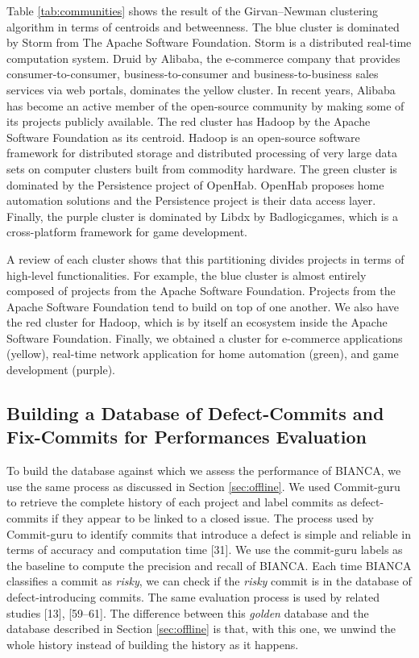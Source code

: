 \documentclass[conference]{IEEEtran}
\begin{document}
Table \ref{tab:communities} shows the result of the Girvan--Newman
clustering algorithm in terms of centroids and betweenness. The blue
cluster is dominated by Storm from The Apache Software Foundation. Storm
is a distributed real-time computation system. Druid by Alibaba, the
e-commerce company that provides consumer-to-consumer,
business-to-consumer and business-to-business sales services via web
portals, dominates the yellow cluster. In recent years, Alibaba has
become an active member of the open-source community by making some of
its projects publicly available. The red cluster has Hadoop by the
Apache Software Foundation as its centroid. Hadoop is an open-source
software framework for distributed storage and distributed processing of
very large data sets on computer clusters built from commodity hardware.
The green cluster is dominated by the Persistence project of OpenHab.
OpenHab proposes home automation solutions and the Persistence project
is their data access layer. Finally, the purple cluster is dominated by
Libdx by Badlogicgames, which is a cross-platform framework for game
development.

A review of each cluster shows that this partitioning divides projects
in terms of high-level functionalities. For example, the blue cluster is
almost entirely composed of projects from the Apache Software
Foundation. Projects from the Apache Software Foundation tend to build
on top of one another. We also have the red cluster for Hadoop, which is
by itself an ecosystem inside the Apache Software Foundation. Finally,
we obtained a cluster for e-commerce applications (yellow), real-time
network application for home automation (green), and game development
(purple).



\subsection{Building a Database of Defect-Commits and Fix-Commits for
Performances Evaluation}\label{sub:golden}

To build the database against which we assess the performance of BIANCA,
we use the same process as discussed in Section \ref{sec:offline}. We
used Commit-guru to retrieve the complete history of each project and
label commits as defect-commits if they appear to be linked to a closed
issue. The process used by Commit-guru to identify commits that
introduce a defect is simple and reliable in terms of accuracy and
computation time {[}31{]}. We use the commit-guru labels as the baseline
to compute the precision and recall of BIANCA. Each time BIANCA
classifies a commit as \emph{risky}, we can check if the \emph{risky}
commit is in the database of defect-introducing commits. The same
evaluation process is used by related studies {[}13{]}, {[}59--61{]}.
The difference between this \emph{golden} database and the database
described in Section \ref{sec:offline} is that, with this one, we unwind
the whole history instead of building the history as it happens.
\end{document}

